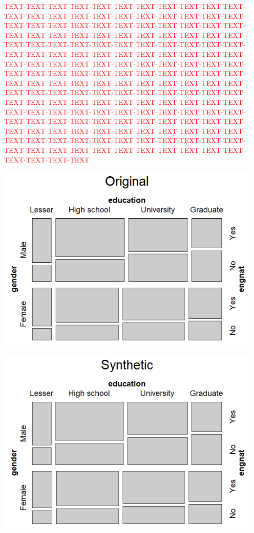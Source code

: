 \documentclass[a0,portrait]{a0poster}
\begin{document}
\begin{multicols}{3}
\textcolor{red}{
TEXT-TEXT-TEXT-TEXT-TEXT-TEXT-TEXT-TEXT-TEXT-TEXT
TEXT-TEXT-TEXT-TEXT-TEXT-TEXT-TEXT-TEXT-TEXT-TEXT
TEXT-TEXT-TEXT-TEXT-TEXT-TEXT-TEXT-TEXT-TEXT-TEXT
TEXT-TEXT-TEXT-TEXT-TEXT-TEXT-TEXT-TEXT-TEXT-TEXT
TEXT-TEXT-TEXT-TEXT-TEXT-TEXT-TEXT-TEXT-TEXT-TEXT
TEXT-TEXT-TEXT-TEXT-TEXT-TEXT-TEXT-TEXT-TEXT-TEXT
TEXT-TEXT-TEXT-TEXT-TEXT-TEXT-TEXT-TEXT-TEXT-TEXT
TEXT-TEXT-TEXT-TEXT-TEXT-TEXT-TEXT-TEXT-TEXT-TEXT
TEXT-TEXT-TEXT-TEXT-TEXT-TEXT-TEXT-TEXT-TEXT-TEXT
TEXT-TEXT-TEXT-TEXT-TEXT-TEXT-TEXT-TEXT-TEXT-TEXT
TEXT-TEXT-TEXT-TEXT-TEXT-TEXT-TEXT-TEXT-TEXT-TEXT
TEXT-TEXT-TEXT-TEXT-TEXT-TEXT-TEXT-TEXT-TEXT-TEXT
TEXT-TEXT-TEXT-TEXT-TEXT-TEXT-TEXT-TEXT-TEXT-TEXT
TEXT-TEXT-TEXT-TEXT-TEXT-TEXT-TEXT-TEXT-TEXT-TEXT
TEXT-TEXT-TEXT-TEXT-TEXT-TEXT-TEXT-TEXT-TEXT-TEXT
TEXT-TEXT-TEXT-TEXT-TEXT-TEXT-TEXT-TEXT-TEXT-TEXT
TEXT-TEXT-TEXT-TEXT-TEXT-TEXT-TEXT-TEXT-TEXT-TEXT
TEXT-TEXT-TEXT-TEXT-TEXT-TEXT-TEXT-TEXT-TEXT-TEXT

} 


\columnbreak %

\includegraphics[width=1\linewidth]{Poster TEX/figures/Mosaic_orig_v5.png}

\includegraphics[width=1\linewidth]{Poster TEX/figures/Mosaic_synt_v5.png}


\end{multicols}
\end{document}
